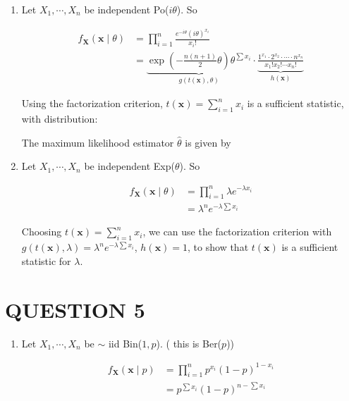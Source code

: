 \documentclass[a4paper]{article}
\begin{document}
\begin{enumerate}[label = (\alph*)]
	\item Let $ X_{1},\cdots,X_{n} $ be independent Po($ i\theta $). So
	
	\begin{align*}
	f_{\mathbf{X}}(\mathbf{x} \; | \; \theta) & =  \prod_{i=1}^{n} \frac{e^{-i\theta}(i \theta)^{x_{i}}}{x_{i}!} \\
	& = \underbrace{\exp  \left(- \frac{n(n+1)}{2} \theta   \right)  \theta^{\sum x_{i}}}_{g(t(\mathbf{x}),\theta)} \cdot \underbrace{\frac{1^{x_{1}} \cdot 2^{x_{2}} \cdot \cdots \cdot n^{x_{n}} }{x_{1}!x_{2}! \cdots x_{n}!}}_{h(\mathbf{x})}
	\end{align*}
	
	Using the factorization criterion, $ t(\mathbf{x}) = \sum_{i=1}^{n} x_{i} $ is a sufficient statistic, with distribution:
	
	The maximum likelihood estimator $ \hat{\theta} $ is given by
	
	\item Let $ X_{1},\cdots,X_{n} $ be independent Exp($ \theta $). So
	
		\begin{align*}
	f_{\mathbf{X}}(\mathbf{x} \; | \; \theta) & =  \prod_{i=1}^{n} \lambda e^{-\lambda x_{i}} \\
	& = \lambda^{n} e^{-\lambda \sum x_{i} }
	\end{align*}
	
	Choosing $ t(\mathbf{x}) = \sum_{i=1}^{n} x_{i} $, we can use the factorization criterion with $ g(t(\mathbf{x}),\lambda) = \lambda^{n} e^{-\lambda \sum x_{i} }$, $ h(\mathbf{x}) = 1 $, to show that $ t(\mathbf{x}) $ is a sufficient statistic for $ \lambda $.
	
\end{enumerate}

\section{QUESTION 5}

\begin{enumerate}[label = (\alph*)]
	\item Let $ X_{1},\cdots,X_{n} $ be $ \sim $ iid Bin($ 1,p $). ( this is Ber($ p $))
	
	\begin{align*}
	f_{\mathbf{X}}(\mathbf{x} \; | \; p) & =  \prod_{i=1}^{n} p^{x_{i}}(1-p)^{1-x_{i}} \\
	& = p^{\sum x_{i}} (1-p)^{n- \sum x_{i}}
	\end{align*}
\end{enumerate}
\end{document}
